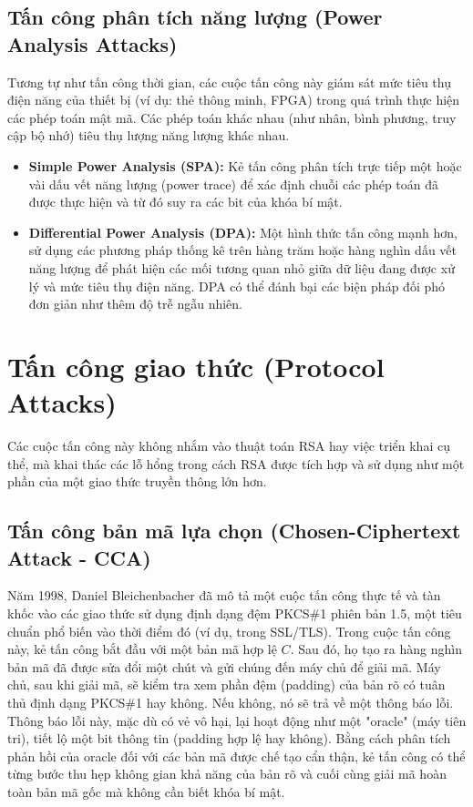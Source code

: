 \documentclass[12pt, a4paper]{article}
\begin{document}
\subsection{Tấn công phân tích năng lượng (Power Analysis Attacks)}
Tương tự như tấn công thời gian, các cuộc tấn công này giám sát mức tiêu thụ điện năng của thiết bị (ví dụ: thẻ thông minh, FPGA) trong quá trình thực hiện các phép toán mật mã. Các phép toán khác nhau (như nhân, bình phương, truy cập bộ nhớ) tiêu thụ lượng năng lượng khác nhau.
\begin{itemize}
    \item \textbf{Simple Power Analysis (SPA):} Kẻ tấn công phân tích trực tiếp một hoặc vài dấu vết năng lượng (power trace) để xác định chuỗi các phép toán đã được thực hiện và từ đó suy ra các bit của khóa bí mật.
    \item \textbf{Differential Power Analysis (DPA):} Một hình thức tấn công mạnh hơn, sử dụng các phương pháp thống kê trên hàng trăm hoặc hàng nghìn dấu vết năng lượng để phát hiện các mối tương quan nhỏ giữa dữ liệu đang được xử lý và mức tiêu thụ điện năng. DPA có thể đánh bại các biện pháp đối phó đơn giản như thêm độ trễ ngẫu nhiên.
\end{itemize}

\section{Tấn công giao thức (Protocol Attacks)}

Các cuộc tấn công này không nhắm vào thuật toán RSA hay việc triển khai cụ thể, mà khai thác các lỗ hổng trong cách RSA được tích hợp và sử dụng như một phần của một giao thức truyền thông lớn hơn.

\subsection{Tấn công bản mã lựa chọn (Chosen-Ciphertext Attack - CCA)}
Năm 1998, Daniel Bleichenbacher đã mô tả một cuộc tấn công thực tế và tàn khốc vào các giao thức sử dụng định dạng đệm PKCS\#1 phiên bản 1.5, một tiêu chuẩn phổ biến vào thời điểm đó (ví dụ, trong SSL/TLS). Trong cuộc tấn công này, kẻ tấn công bắt đầu với một bản mã hợp lệ $C$. Sau đó, họ tạo ra hàng nghìn bản mã đã được sửa đổi một chút và gửi chúng đến máy chủ để giải mã. Máy chủ, sau khi giải mã, sẽ kiểm tra xem phần đệm (padding) của bản rõ có tuân thủ định dạng PKCS\#1 hay không. Nếu không, nó sẽ trả về một thông báo lỗi. Thông báo lỗi này, mặc dù có vẻ vô hại, lại hoạt động như một "oracle" (máy tiên tri), tiết lộ một bit thông tin (padding hợp lệ hay không). Bằng cách phân tích phản hồi của oracle đối với các bản mã được chế tạo cẩn thận, kẻ tấn công có thể từng bước thu hẹp không gian khả năng của bản rõ và cuối cùng giải mã hoàn toàn bản mã gốc mà không cần biết khóa bí mật.
\end{document}
